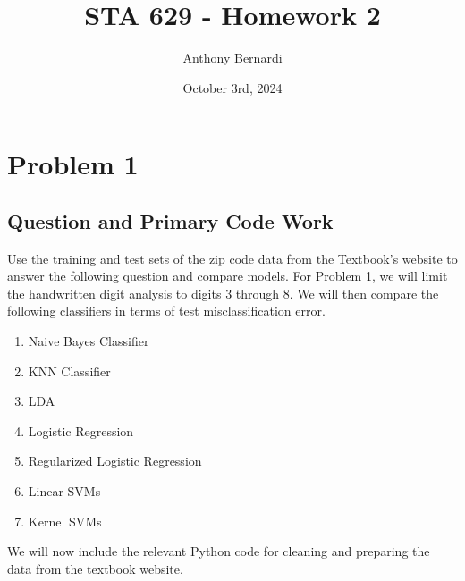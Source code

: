 \documentclass[12pt, letterpaper]{article}
\title{STA 629 - Homework 2}
\author{Anthony Bernardi}
\date{October 3rd, 2024}
\begin{document}
\maketitle

\section{Problem 1}

\subsection{Question and Primary Code Work}

Use the training and test sets of the zip code data from the Textbook's website to answer the following question and compare models. For Problem 1, we will limit the handwritten digit analysis 
to digits 3 through 8. We will then compare the following classifiers in terms of test misclassification error. 

\begin{enumerate} 
  \item Naive Bayes Classifier 
  \item KNN Classifier 
  \item LDA 
  \item Logistic Regression 
  \item Regularized Logistic Regression 
  \item Linear SVMs 
  \item Kernel SVMs 
\end{enumerate}

We will now include the relevant Python code for cleaning and preparing the data from the textbook website. 
\end{document}

